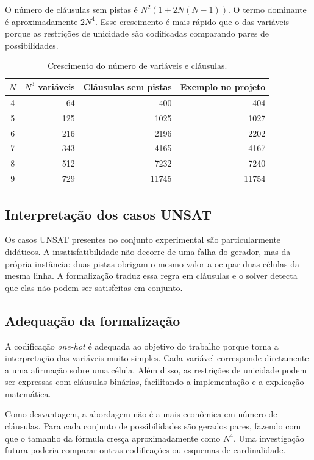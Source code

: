 \documentclass[a4paper, 12pt]{article}
\begin{document}
O número de cláusulas sem pistas é \(N^2(1+2N(N-1))\). O termo dominante é aproximadamente \(2N^4\). Esse crescimento é mais rápido que o das variáveis porque as restrições de unicidade são codificadas comparando pares de possibilidades.

\begin{table}[H]
\centering
\caption{Crescimento do número de variáveis e cláusulas.}
\begin{tabular}{c r r r}
\toprule
\(N\) & \(N^3\) variáveis & Cláusulas sem pistas & Exemplo no projeto \\
\midrule
4 & 64 & 400 & 404 \\
5 & 125 & 1025 & 1027 \\
6 & 216 & 2196 & 2202 \\
7 & 343 & 4165 & 4167 \\
8 & 512 & 7232 & 7240 \\
9 & 729 & 11745 & 11754 \\
\bottomrule
\end{tabular}
\end{table}

\subsection{Interpretação dos casos UNSAT}

Os casos UNSAT presentes no conjunto experimental são particularmente didáticos. A insatisfatibilidade não decorre de uma falha do gerador, mas da própria instância: duas pistas obrigam o mesmo valor a ocupar duas células da mesma linha. A formalização traduz essa regra em cláusulas e o solver detecta que elas não podem ser satisfeitas em conjunto.

\subsection{Adequação da formalização}

A codificação \emph{one-hot} é adequada ao objetivo do trabalho porque torna a interpretação das variáveis muito simples. Cada variável corresponde diretamente a uma afirmação sobre uma célula. Além disso, as restrições de unicidade podem ser expressas com cláusulas binárias, facilitando a implementação e a explicação matemática.

Como desvantagem, a abordagem não é a mais econômica em número de cláusulas. Para cada conjunto de possibilidades são gerados pares, fazendo com que o tamanho da fórmula cresça aproximadamente como \(N^4\). Uma investigação futura poderia comparar outras codificações ou esquemas de cardinalidade.
\end{document}
